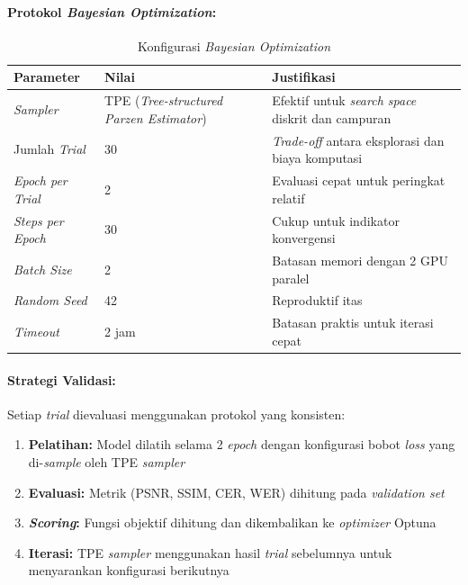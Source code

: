 \documentclass[12pt,a4paper]{article}
\begin{document}
\paragraph{Protokol \textit{Bayesian Optimization}:}

\begin{table}[H]
\centering
\caption{Konfigurasi \textit{Bayesian Optimization}}
\label{tab:bayesian-opt-config}
\small
\begin{tabular}{|l|l|p{6cm}|}
\hline
\textbf{Parameter} & \textbf{Nilai} & \textbf{Justifikasi} \\ \hline
\textit{Sampler} & TPE (\textit{Tree-structured Parzen Estimator}) & Efektif untuk \textit{search space} diskrit dan campuran \\ \hline
Jumlah \textit{Trial} & 30 & \textit{Trade-off} antara eksplorasi dan biaya komputasi \\ \hline
\textit{Epoch per Trial} & 2 & Evaluasi cepat untuk peringkat relatif \\ \hline
\textit{Steps per Epoch} & 30 & Cukup untuk indikator konvergensi \\ \hline
\textit{Batch Size} & 2 & Batasan memori dengan 2 GPU paralel \\ \hline
\textit{Random Seed} & 42 & Reproduktif itas \\ \hline
\textit{Timeout} & 2 jam & Batasan praktis untuk iterasi cepat \\ \hline
\end{tabular}
\end{table}

\paragraph{Strategi Validasi:}

Setiap \textit{trial} dievaluasi menggunakan protokol yang konsisten:

\begin{enumerate}[label=\arabic*., leftmargin=*, nosep]
\item \textbf{Pelatihan:} Model dilatih selama 2 \textit{epoch} dengan konfigurasi bobot \textit{loss} yang di-\textit{sample} oleh TPE \textit{sampler}
\item \textbf{Evaluasi:} Metrik (PSNR, SSIM, CER, WER) dihitung pada \textit{validation set}
\item \textbf{\textit{Scoring}:} Fungsi objektif dihitung dan dikembalikan ke \textit{optimizer} Optuna
\item \textbf{Iterasi:} TPE \textit{sampler} menggunakan hasil \textit{trial} sebelumnya untuk menyarankan konfigurasi berikutnya
\end{enumerate}
\end{document}
